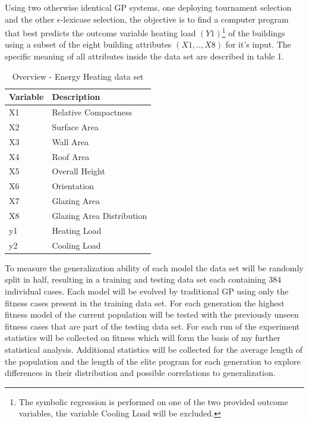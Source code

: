 \documentclass[
  12pt,
]{article}
\begin{document}
Using two otherwise identical GP systems, one deploying tournament
selection and the other \(\epsilon\)-lexicase selection, the objective
is to find a computer program that best predicts the outcome variable
heating load \((Y1)\)\footnote{The symbolic regression is performed on
  one of the two provided outcome variables, the variable Cooling Load
  will be excluded.} of the buildings using a subset of the eight
building attributes \((X1,..,X8)\) for it's input. The specific meaning
of all attributes inside the data set are described in table 1.

\begin{table}[!h]

\caption{\label{tab:unnamed-chunk-1}Overview - Energy Heating data set}
\centering
\begin{tabular}[t]{l|l}
\hline
\textbf{Variable} & \textbf{Description}\\
\hline
X1 & Relative Compactness\\
\hline
X2 & Surface Area\\
\hline
X3 & Wall Area\\
\hline
X4 & Roof Area\\
\hline
X5 & Overall Height\\
\hline
X6 & Orientation\\
\hline
X7 & Glazing Area\\
\hline
X8 & Glazing Area Distribution\\
\hline
y1 & Heating Load\\
\hline
y2 & Cooling Load\\
\hline
\end{tabular}
\end{table}

To measure the generalization ability of each model the data set will be
randomly split in half, resulting in a training and testing data set
each containing 384 individual cases. Each model will be evolved by
traditional GP using only the fitness cases present in the training data
set. For each generation the highest fitness model of the current
population will be tested with the previously unseen fitness cases that
are part of the testing data set. For each run of the experiment
statistics will be collected on fitness which will form the basis of my
further statistical analysis. Additional statistics will be collected
for the average length of the population and the length of the elite
program for each generation to explore differences in their distribution
and possible correlations to generalization.
\end{document}
